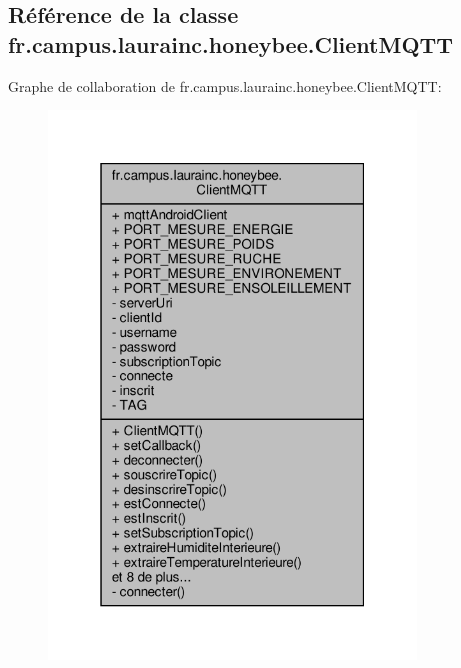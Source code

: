 \hypertarget{classfr_1_1campus_1_1laurainc_1_1honeybee_1_1_client_m_q_t_t}{}\subsection{Référence de la classe fr.\+campus.\+laurainc.\+honeybee.\+Client\+M\+Q\+TT}
\label{classfr_1_1campus_1_1laurainc_1_1honeybee_1_1_client_m_q_t_t}


Graphe de collaboration de fr.\+campus.\+laurainc.\+honeybee.\+Client\+M\+Q\+TT\+:\nopagebreak
\begin{figure}[H]
\begin{center}
\leavevmode
\includegraphics[width=277pt]{classfr_1_1campus_1_1laurainc_1_1honeybee_1_1_client_m_q_t_t__coll__graph}
\end{center}
\end{figure}
